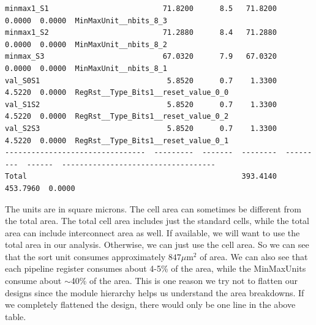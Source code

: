 \documentclass[a4paper,12pt,twoside]{article}
\begin{document}
\begin{verbatim}
minmax1_S1                          71.8200      8.5   71.8200     0.0000  0.0000  MinMaxUnit__nbits_8_3
minmax1_S2                          71.2880      8.4   71.2880     0.0000  0.0000  MinMaxUnit__nbits_8_2
minmax_S3                           67.0320      7.9   67.0320     0.0000  0.0000  MinMaxUnit__nbits_8_1
val_S0S1                             5.8520      0.7    1.3300     4.5220  0.0000  RegRst__Type_Bits1__reset_value_0_0
val_S1S2                             5.8520      0.7    1.3300     4.5220  0.0000  RegRst__Type_Bits1__reset_value_0_2
val_S2S3                             5.8520      0.7    1.3300     4.5220  0.0000  RegRst__Type_Bits1__reset_value_0_1
--------------------------------  ---------  -------  --------  ---------  ------  -----------------------------------
Total                                                 393.4140   453.7960  0.0000
\end{verbatim}
The units are in square microns. The cell area can sometimes be different from the total area. The total cell area includes just the standard cells, while the total area can include interconnect area as well. If available, we will want to use the total area in our analysis. Otherwise, we can just use the cell area. So we can see that the sort unit consumes approximately $847\mu \text{m}^2$ of area. We can also see that each pipeline register consumes about 4-5\% of the area, while the MinMaxUnits consume about $\sim$40\% of the area. This is one reason we try not to flatten our designs since the module hierarchy helps us understand the area breakdowns. If we completely flattened the design, there would only be one line in the above table.
\end{document}
